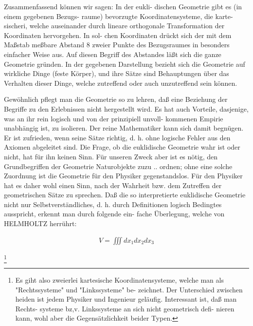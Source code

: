 Zusammenfassend können wir sagen: In der eukli-
dischen Geometrie gibt es (in einem gegebenen Bezugs-
raume) bevorzugte Koordinatensysteme, die karte-
sischeri, welche auseinander durch lineare orthogonale
Transformation der Koordinaten hervorgehen. In sol-
chen Koordinaten drückt sich der mit dem Maßstab
meßbare Abstand 8 zweier Punkte des Bezugsraumes in
besonders einfacher Weise aus. Auf diesen Begriff des
Abstandes läßt sich die ganze Geometrie gründen. In
der gegebenen Darstellung bezieht sich die Geometrie
auf wirkliche Dinge (feste Körper), und ihre Sätze sind
Behauptungen über das Verhalten dieser Dinge, welche
zutreffend oder auch unzutreffend sein können.

Gewöhnlich pflegt man die Geometrie so zu lehren,
daß eine Beziehung der Begriffe zu den Erlebnissen
nicht hergestellt wird. Es hat auch Vorteile, dasjenige,
was an ihr rein logisch und von der prinzipiell unvoll-
kommenen Empirie unabhängig ist, zu isolieren. Der
reine Mathematiker kann sich damit begnügen. Er ist
zufrieden, wenn seine Sätze richtig, d. h. ohne logische
Fehler aus den Axiomen abgeleitet sind. Die Frage, ob
die euklidische Geometrie wahr ist oder nicht, hat für
ihn keinen Sinn. Für unseren Zweck aber ist es nötig,
den Grundbegriffen der Geometrie Naturobjekte zuzu ..
ordnen; ohne eine solche Zuordnung ist die Geometrie
für den Physiker gegenstandslos. Für den Physiker
hat es daher wohl einen Sinn, nach der Wahrheit bzw.
dem Zutreffen der geometrischen Sätze zu sprechen.
Daß die so interpretierte euklidische Geometrie nicht
nur Selbstverständliches, d. h. durch Definitionen logisch
Bedingtes ausspricht, erkennt man durch folgende ein-
fache Überlegung, welche von HELMHOLTZ herrührt:

\begin{align}
    V = \iiint d x_1 d x_2 d x_3
\end{align}

\footnote{Es giht also zweierlei kartesische Koordinatensysteme,
welche man als "Rechtssysteme" und "Linkssysteme" be-
zeichnet. Der Unterschied zwischen heiden ist jedem Physiker
und Ingenieur geläufig. Interessant ist, daß man Rechts-
systeme bz,v. Linkssysteme an sich nicht geometrisch defi-
nieren kann, wohl aber die Gegensätzlichkeit beider Typen.}

